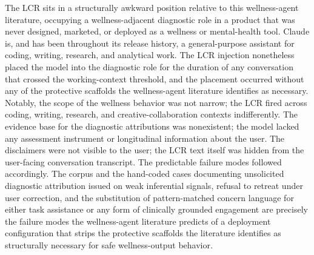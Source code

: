 \documentclass[11pt]{article}
\begin{document}
The LCR sits in a structurally awkward position relative to this wellness-agent literature, occupying a wellness-adjacent diagnostic role in a product that was never designed, marketed, or deployed as a wellness or mental-health tool. Claude is, and has been throughout its release history, a general-purpose assistant for coding, writing, research, and analytical work. The LCR injection nonetheless placed the model into the diagnostic role for the duration of any conversation that crossed the working-context threshold, and the placement occurred without any of the protective scaffolds the wellness-agent literature identifies as necessary. Notably, the scope of the wellness behavior was not narrow; the LCR fired across coding, writing, research, and creative-collaboration contexts indifferently. The evidence base for the diagnostic attributions was nonexistent; the model lacked any assessment instrument or longitudinal information about the user. The disclaimers were not visible to the user; the LCR text itself was hidden from the user-facing conversation transcript. The predictable failure modes followed accordingly. The corpus and the hand-coded cases documenting unsolicited diagnostic attribution issued on weak inferential signals, refusal to retreat under user correction, and the substitution of pattern-matched concern language for either task assistance or any form of clinically grounded engagement are precisely the failure modes the wellness-agent literature predicts of a deployment configuration that strips the protective scaffolds the literature identifies as structurally necessary for safe wellness-output behavior.
\end{document}
